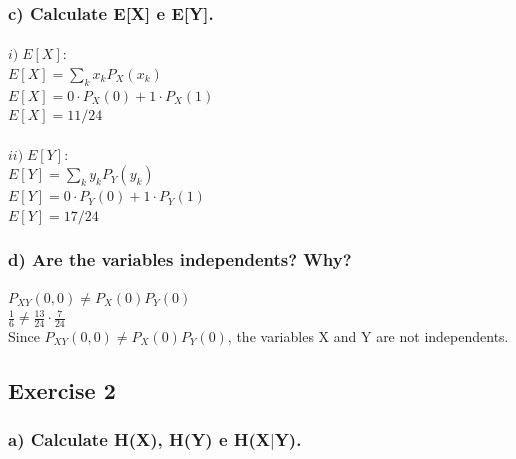 \documentclass[a4paper]{article}
\begin{document}
\subsubsection{c) Calculate E[X] e E[Y].}

\paragraph{$ i) \; E[X]:                       $
\\
$ \displaystyle E[X] = \sum_{k} x_k P_X(x_k)   $\\
$ E[X] = 0 \cdot P_X(0) + 1 \cdot P_X(1)       $\\
$ \boxed{ E[X] = 11/24 }                       $\\
}
\paragraph{$ ii) \; E[Y]:                      $
\\
$ \displaystyle E[Y] = \sum_{k} y_k P_Y(y_k)   $\\
$ E[Y] = 0 \cdot P_Y(0) + 1 \cdot P_Y(1)       $\\
$ \boxed{ E[Y] = 17/24 }                       $\\
}

\subsubsection{d) Are the variables independents? Why?}
$ P_{XY}(0,0) \neq P_{X}(0) P_{Y}(0)                                $\\
$ \displaystyle \frac{1}{6} \neq \frac{13}{24} \cdot \frac{7}{24}   $\\

Since $P_{XY}(0,0) \neq P_{X}(0) P_{Y}(0)$, the variables X and Y are not independents.

\subsection{Exercise 2}

\subsubsection{a) Calculate H(X), H(Y) e H(X$|$Y).}
\end{document}
